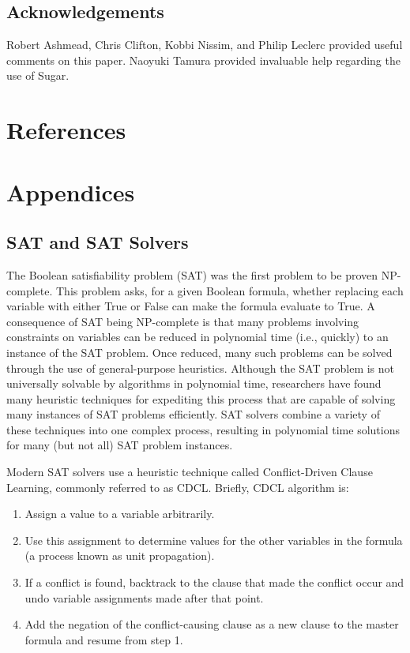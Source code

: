 \documentclass[runningheads]{llncs}
\begin{document}
\subsection{Acknowledgements}
Robert Ashmead, Chris Clifton, Kobbi Nissim, and Philip Leclerc provided useful
comments on this paper. Naoyuki Tamura provided invaluable help
regarding the use of Sugar.

\section{References}




\section{Appendices}

\subsection{SAT and SAT Solvers}

The Boolean satisfiability problem (SAT) was the first
problem to be proven NP-complete\cite{cooklevin}. This problem asks,
for a given Boolean formula, whether replacing each variable with
either True or False can make the formula evaluate to True.  A
consequence of SAT being NP-complete is that many problems involving
constraints on variables can be
reduced in polynomial time (i.e., quickly) to an instance of the SAT
problem. Once reduced, many such problems can be solved through the
use of general-purpose heuristics. Although the SAT problem is not universally solvable by
algorithms in polynomial time, researchers have found many heuristic
techniques for expediting this process that are capable of solving many instances of SAT problems efficiently. SAT solvers combine a variety
of these techniques into one complex process, resulting in polynomial
time solutions for many (but not all) SAT problem instances.

Modern SAT solvers use a heuristic technique called Conflict-Driven
Clause Learning, commonly referred to as CDCL\cite{cdcl}. Briefly, CDCL algorithm
is:

\begin{enumerate}

\item Assign a value to a variable arbitrarily.
\item Use this assignment to determine values for the other variables
  in the formula (a process known as unit propagation).
\item If a conflict is found, backtrack to the clause that made the
  conflict occur and undo variable assignments made after that point.
\item Add the negation of the conflict-causing clause as a new clause
  to the master formula and resume from step 1.

\end{enumerate}
\end{document}
